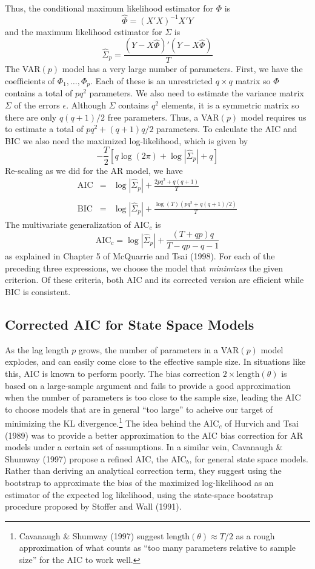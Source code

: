 Thus, the conditional maximum likelihood estimator for $\Phi$ is
	$$\widehat{\Phi} = (X'X)^{-1} X'Y$$
and the maximum likelihood estimator for $\Sigma$ is
	$$\widehat{\Sigma}_p = \frac{\left(Y - X\widehat{\Phi}\right)'\left(Y - X\widehat{\Phi}\right)}{T}$$
The VAR$(p)$ model has a very large number of parameters. First, we have the coefficients of $\Phi_1, \hdots, \Phi_p$. Each of these is an unrestricted $q\times q$ matrix so $\Phi$ contains a total of $pq^2$ parameters. We also need to estimate the variance matrix $\Sigma$ of the errors $\epsilon$. Although $\Sigma$ contains $q^2$ elements, it is a symmetric matrix so there are only $q(q+1)/2$ free parameters. Thus, a VAR$(p)$ model requires us to estimate a total of $pq^2 + (q+1)q/2$ parameters. To calculate the AIC and BIC we also need the maximized log-likelihood, which is given by
	$$-\frac{T}{2} \left[q\log(2\pi) + \log \left| \widehat{\Sigma}_p\right| + q\right]$$
Re-scaling as we did for the AR model, we have
\begin{eqnarray*}
	\mbox{AIC} &=& \log \left| \widehat{\Sigma}_p\right| + \frac{2pq^2 + q(q+1)}{T}\\ \\
	\mbox{BIC} &=& \log \left| \widehat{\Sigma}_p\right| +  \frac{\log(T)(pq^2 + q(q+1)/2)}{T}
\end{eqnarray*}
The multivariate generalization of AIC$_c$ is
$$\mbox{AIC}_c = \log \left| \widehat{\Sigma}_p\right|  + \frac{(T + qp)q}{T - qp - q -1}$$
as explained in Chapter 5 of McQuarrie and Tsai (1998). For each of the preceding three expressions, we choose the model that \emph{minimizes} the given criterion. Of these criteria, both AIC and its corrected version are efficient while BIC is consistent. 

\subsection{Corrected AIC for State Space Models}
As the lag length $p$ grows, the number of parameters in a VAR$(p)$ model explodes, and can easily come close to the effective sample size. In situations like this, AIC is known to perform poorly. The bias correction $2\times \mbox{length}(\theta)$ is based on a large-sample argument and fails to provide a good approximation when the number of parameters is too close to the sample size, leading the AIC to choose models that are in general ``too large'' to acheive our target of minimizing the KL divergence.\footnote{Cavanaugh \& Shumway (1997) suggest $\mbox{length}(\theta) \approx T/2$ as a rough approximation of what counts as ``too many parameters relative to sample size'' for the AIC to work well.} The idea behind the AIC$_c$ of Hurvich and Tsai (1989) was to provide a better approximation to the AIC bias correction for AR models under a certain set of assumptions. In a similar vein, Cavanaugh \& Shumway (1997) propose a refined AIC, the AIC$_b$, for general state space models. Rather than deriving an analytical correction term, they suggest using the bootstrap to approximate the bias of the maximized log-likelihood as an estimator of the expected log likelihood, using the state-space bootstrap procedure proposed by Stoffer and Wall (1991).  

